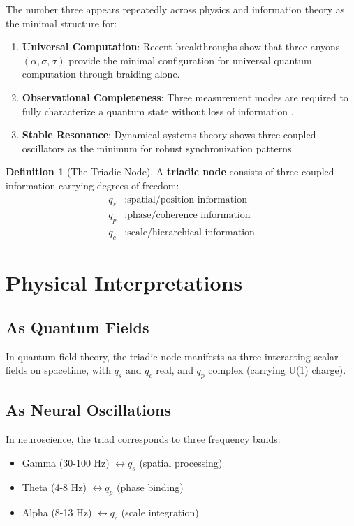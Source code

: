 \documentclass[openany]{memoir}
\theoremstyle{definition}
\newtheorem{definition}{Definition}[chapter]
\theoremstyle{plain}
\theoremstyle{remark}
\begin{document}
The number three appears repeatedly across physics and information theory as the minimal structure for:
\begin{enumerate}
\item \textbf{Universal Computation}: Recent breakthroughs \cite{Iulianelli2025} show that three anyons $(\alpha, \sigma, \sigma)$ provide the minimal configuration for universal quantum computation through braiding alone.
\item \textbf{Observational Completeness}: Three measurement modes are required to fully characterize a quantum state without loss of information \cite{Cairo2025}.
\item \textbf{Stable Resonance}: Dynamical systems theory shows three coupled oscillators as the minimum for robust synchronization patterns.
\end{enumerate}

\begin{definition}[The Triadic Node]
A \textbf{triadic node} consists of three coupled information-carrying degrees of freedom:
\begin{align}
q_s &: \text{spatial/position information} \\
q_p &: \text{phase/coherence information} \\
q_c &: \text{scale/hierarchical information}
\end{align}
\end{definition}

\section{Physical Interpretations}

\subsection{As Quantum Fields}
In quantum field theory, the triadic node manifests as three interacting scalar fields on spacetime, with $q_s$ and $q_c$ real, and $q_p$ complex (carrying U(1) charge).

\subsection{As Neural Oscillations}
In neuroscience, the triad corresponds to three frequency bands:
\begin{itemize}
\item Gamma (30-100 Hz) $\leftrightarrow q_s$ (spatial processing)
\item Theta (4-8 Hz) $\leftrightarrow q_p$ (phase binding)
\item Alpha (8-13 Hz) $\leftrightarrow q_c$ (scale integration)
\end{itemize}
\end{document}
